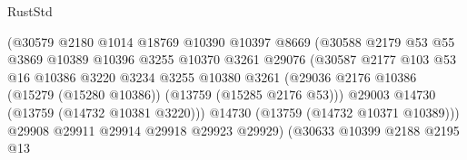 \begin{lexlean}{RustStd}
\begin{coremodule}
                                        (@30579
                                          @2180
                                          @1014
                                          @18769
                                          @10390
                                          @10397
                                          @8669
                                          (@30588
                                            @2179
                                            @53
                                            @55
                                            @3869
                                            @10389
                                            @10396
                                            @3255
                                            @10370
                                            @3261
                                            @29076
                                            (@30587
                                              @2177
                                              @103
                                              @53
                                              @16
                                              @10386
                                              @3220
                                              @3234
                                              @3255
                                              @10380
                                              @3261
                                              (@29036
                                                @2176
                                                @10386
                                                (@15279 (@15280 @10386))
                                                (@13759 (@15285 @2176 @53)))
                                              @29003
                                              @14730
                                              (@13759 (@14732 @10381 @3220)))
                                            @14730
                                            (@13759 (@14732 @10371 @10389)))
                                          @29908
                                          @29911
                                          @29914
                                          @29918
                                          @29923
                                          @29929)
                                        (@30633
                                          @10399
                                          @2188
                                          @2195
                                          @13

\end{coremodule}
\end{lexlean}

